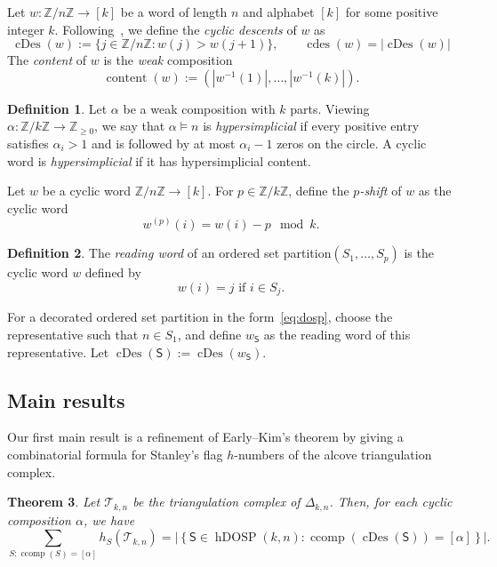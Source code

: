 \documentclass[12pt,reqno]{amsart}
\theoremstyle{plain}
\newtheorem{theorem}{Theorem}[section]
\theoremstyle{definition}
\newtheorem{definition}[theorem]{Definition}
\newcommand{\Z}{\mathbb{Z}}
\newcommand{\hyp}{\Delta_{k,n}}
\newcommand{\Tri}{\mathcal{T}_{k,n}}
\newcommand{\dosp}{\mathsf{S}}
\DeclareMathOperator{\ccomp}{ccomp}
\DeclareMathOperator{\cDes}{cDes}
\DeclareMathOperator{\hDOSP}{hDOSP}
\DeclareMathOperator{\cdes}{cdes}
\DeclareMathOperator{\content}{content}
\begin{document}
Let $ w:\Z/n\Z \to [k] $ be a word of length $n$ and alphabet $[k]$ for some positive integer $k$.
Following~\cite{magicnumber}, we define the \emph{cyclic descents} of $w$ as
\begin{equation}\label{eq:cdes}
	\cDes(w):=\{j\in\Z/n\Z:w(j)>w(j+1)\},\qquad \cdes(w) = |\cDes(w)|
\end{equation}
The \emph{content} of $ w $
is the \emph{weak} composition
\begin{equation}
	\content(w):= (|w^{-1}(1)|,\dots,|w^{-1}(k)|).
\end{equation}

\begin{definition}\label{def:hypersimplicial}
	Let $\alpha$ be a weak composition with $k$ parts.
	Viewing $\alpha: \Z/k\Z \to \Z_{\geq 0}$, we say that $\alpha \models n$ is \emph{hypersimplicial} if every positive entry satisfies $ \alpha_i > 1 $ and is
	followed by at most $ \alpha_i - 1 $ zeros on the circle.
	A cyclic word is \emph{hypersimplicial} if it has
	hypersimplicial content.
\end{definition}
Let $w$ be a cyclic word $\Z/n\Z \to [k]$. For $ p \in \Z/k\Z $, define the \emph{$p$-shift} of $ w $ as the cyclic word
\begin{equation}\label{eq:pshift}
	w^{(p)}(i) = w(i) - p \mod k.
\end{equation}

\begin{definition}\label{def:reading_word}
	The \emph{reading word} of an ordered set partition$(S_1,\dots,S_p)$ is the cyclic word $ w $ defined by
	\begin{equation}\label{eq:reading-osp}
		w(i)= j \text{ if } i \in S_j.
	\end{equation}
\end{definition}
For a decorated ordered set partition in the form~\eqref{eq:dosp}, choose the representative such that $n \in S_1$, and
define $w_{\dosp}$ as the reading word of this representative. Let $\cDes(\dosp):= \cDes(w_{\dosp})$.

\subsection{Main results}\label{ss:main_results}
Our first main result is a refinement of Early--Kim's theorem by giving a combinatorial formula for Stanley's flag $ h
$-numbers of the alcove triangulation complex.
\begin{theorem}\label{thm:hmain}
	Let $ \Tri $ be the triangulation complex of $ \hyp $.
	Then, for each cyclic composition $ \alpha $, we have
	\begin{equation}
		\sum_{S: \ccomp(S) = [\alpha]} h_S(\Tri) = \left| \left\{ \dosp \in \hDOSP(k,n): \ccomp(\cDes(\dosp)) = [\alpha] \right\}\right|.
	\end{equation}
\end{theorem}
\end{document}
